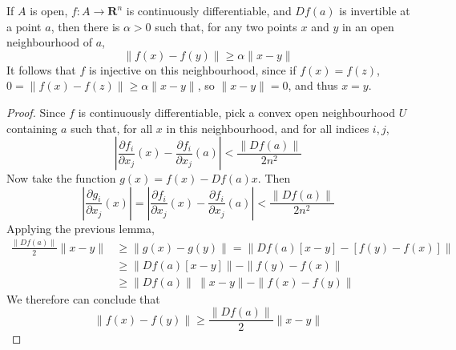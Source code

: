 \begin{corollary}
    If $A$ is open, $f: A \to \mathbf{R}^n$ is continuously differentiable, and $Df(a)$ is invertible at a point $a$, then there is $\alpha > 0$ such that, for any two points $x$ and $y$ in an open neighbourhood of $a$,
    \[ \| f(x) - f(y) \| \geq \alpha \| x - y \| \]
    It follows that $f$ is injective on this neighbourhood, since if $f(x) = f(z)$, $0 = \|f(x) - f(z)\| \geq \alpha \|x - y\|$, so $\|x - y\| = 0$, and thus $x = y$.
\end{corollary}
\begin{proof}
    Since $f$ is continuously differentiable, pick a convex open neighbourhood $U$ containing $a$ such that, for all $x$ in this neighbourhood, and for all indices $i, j$,
    \[ | \frac{\partial f_i}{\partial x_j}(x) - \frac{\partial f_i}{\partial x_j}(a) | < \frac{\|Df(a)\|}{2n^2} \]
    Now take the function $g(x) = f(x) - Df(a)x$. Then
    \[ | \frac{\partial g_i}{\partial x_j}(x) | = | \frac{\partial f_i}{\partial x_j}(x) - \frac{\partial f_i}{\partial x_j}(a) | < \frac{\|Df(a)\|}{2n^2} \]
    Applying the previous lemma,
    \begin{align*}
        \frac{\|Df(a)\|}{2} \|x - y\| &\geq \| g(x) - g(y) \| = \| Df(a)[x - y] - [f(y) - f(x)] \|\\
        &\geq \| Df(a) [x - y]\| - \|f(y) - f(x)\| \\
    &\geq \|Df(a)\|\ \|x - y\| - \|f(x) - f(y)\|
    \end{align*}
    We therefore can conclude that
    \[ \|f(x) - f(y)\| \geq \frac{\|Df(a)\|}{2} \|x - y\| \]
\end{proof}

